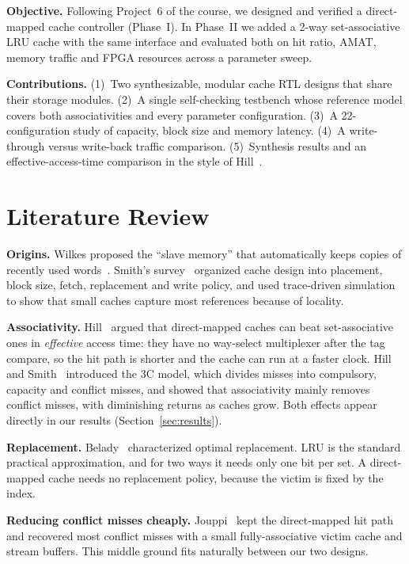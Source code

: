 \documentclass[conference]{IEEEtran}
\begin{document}
\textbf{Objective.} Following Project~6 of the course, we designed and verified a direct-mapped cache controller (Phase~I). In Phase~II we added a 2-way set-associative LRU cache with the same interface and evaluated both on hit ratio, AMAT, memory traffic and FPGA resources across a parameter sweep.

\textbf{Contributions.} (1)~Two synthesizable, modular cache RTL designs that share their storage modules. (2)~A single self-checking testbench whose reference model covers both associativities and every parameter configuration. (3)~A 22-configuration study of capacity, block size and memory latency. (4)~A write-through versus write-back traffic comparison. (5)~Synthesis results and an effective-access-time comparison in the style of Hill~\cite{hill1988}.

\section{Literature Review}
\textbf{Origins.} Wilkes proposed the ``slave memory'' that automatically keeps copies of recently used words~\cite{wilkes1965}. Smith's survey~\cite{smith1982} organized cache design into placement, block size, fetch, replacement and write policy, and used trace-driven simulation to show that small caches capture most references because of locality.

\textbf{Associativity.} Hill~\cite{hill1988} argued that direct-mapped caches can beat set-associative ones in \emph{effective} access time: they have no way-select multiplexer after the tag compare, so the hit path is shorter and the cache can run at a faster clock. Hill and Smith~\cite{hill1989} introduced the 3C model, which divides misses into compulsory, capacity and conflict misses, and showed that associativity mainly removes conflict misses, with diminishing returns as caches grow. Both effects appear directly in our results (Section~\ref{sec:results}).

\textbf{Replacement.} Belady~\cite{belady1966} characterized optimal replacement. LRU is the standard practical approximation, and for two ways it needs only one bit per set. A direct-mapped cache needs no replacement policy, because the victim is fixed by the index.

\textbf{Reducing conflict misses cheaply.} Jouppi~\cite{jouppi1990} kept the direct-mapped hit path and recovered most conflict misses with a small fully-associative victim cache and stream buffers. This middle ground fits naturally between our two designs.
\end{document}
